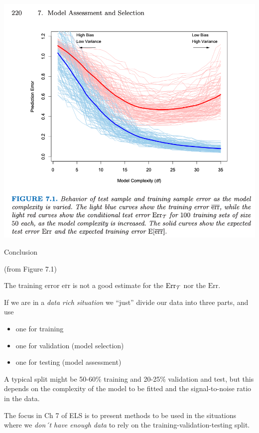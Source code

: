 \documentclass[
  ignorenonframetext,
]{beamer}
\providecommand{\tightlist}{%
  \setlength{\itemsep}{0pt}\setlength{\parskip}{0pt}}
\begin{document}
\begin{frame}

\includegraphics{ELSfig71.png}

\end{frame}

\begin{frame}

\begin{block}{Conclusion}

(from Figure 7.1)

The training error \(\overline{\text{err}}\) is not a good estimate for
the \(\text{Err}_{\cal T}\) nor the \(\text{Err}\).

If we are in a \emph{data rich situation} we ``just'' divide our data
into three parts, and use

\begin{itemize}
\tightlist
\item
  one for training
\item
  one for validation (model selection)
\item
  one for testing (model assessment)
\end{itemize}

A typical split might be 50-60\% training and 20-25\% validation and
test, but this depends on the complexity of the model to be fitted and
the signal-to-noise ratio in the data.

The focus in Ch 7 of ELS is to present methods to be used in the
situations where we \emph{don´t have enough data} to rely on the
training-validation-testing split.

\end{block}

\end{frame}
\end{document}
